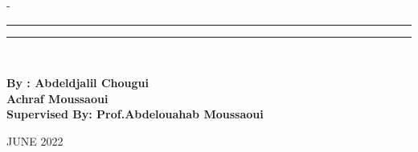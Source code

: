 \begin{titlingpage}
\begin{SingleSpace}
\begin{adjustwidth*}{\unitlength}{-\unitlength}
\begin{center}
\begin{minipage}{0.95\textwidth}
\begin{center}
\rule[0.5ex]{\linewidth}{1pt}\vspace*{-\baselineskip}\vspace{3.2pt}
\rule[0.5ex]{\linewidth}{2pt}\\
\end{center}
\end{minipage}
\begin{minipage}{0.85\textwidth}
\begin{center}
\vspace{10mm}
  \textbf{By : Abdeldjalil Chougui}\\ \vspace{3mm}
  \hspace{10mm}\textbf{Achraf Moussaoui}
  \vspace{3mm}\\
  \textbf{Supervised By: Prof.Abdelouahab Moussaoui}
   \vspace{3mm}\\
  
 
  \vspace{0.6cm}
\end{center}
\end{minipage}

{\large\textsc{JUNE 2022}}
\vspace{12mm}
\end{center}
\end{adjustwidth*}
\end{SingleSpace}
\end{titlingpage}






















